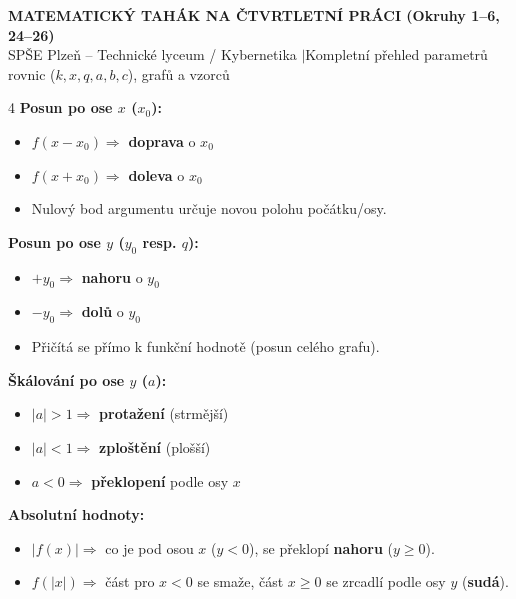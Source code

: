 \documentclass[9pt,a4paper]{article}
\begin{document}
\begin{tcolorbox}[colback=primary,colframe=primary,arc=1mm,left=2mm,right=2mm,top=1mm,bottom=1mm]
\color{white}
\begin{center}
{\bfseries\large MATEMATICKÝ TAHÁK NA ČTVRTLETNÍ PRÁCI (Okruhy 1--6, 24--26)}\\
{\footnotesize SPŠE Plzeň -- Technické lyceum / Kybernetika \quad$\vert$\quad Kompletní přehled parametrů rovnic ($k, x, q, a, b, c$), grafů a vzorců}
\end{center}
\end{tcolorbox}

\begin{tcolorbox}[secbox,title=0. UNIVERZÁLNÍ TRANSFORMACE GRAFŮ: $y = a \cdot f\bigl(b(x - x_0)\bigr) + y_0$ (nebo $a \cdot f(x - m) + n$)]
\begin{multicols}{4}
\textbf{Posun po ose $x$ ($x_0$):}
\begin{itemize}
  \item $f(x - x_0) \Rightarrow$ \textbf{doprava} o $x_0$
  \item $f(x + x_0) \Rightarrow$ \textbf{doleva} o $x_0$
  \item Nulový bod argumentu určuje novou polohu počátku/osy.
\end{itemize}
\columnbreak
\textbf{Posun po ose $y$ ($y_0$ resp. $q$):}
\begin{itemize}
  \item $+ y_0 \Rightarrow$ \textbf{nahoru} o $y_0$
  \item $- y_0 \Rightarrow$ \textbf{dolů} o $y_0$
  \item Přičítá se přímo k funkční hodnotě (posun celého grafu).
\end{itemize}
\columnbreak
\textbf{Škálování po ose $y$ ($a$):}
\begin{itemize}
  \item $|a| > 1 \Rightarrow$ \textbf{protažení} (strmější)
  \item $|a| < 1 \Rightarrow$ \textbf{zploštění} (plošší)
  \item $a < 0 \Rightarrow$ \textbf{překlopení} podle osy $x$
\end{itemize}
\columnbreak
\textbf{Absolutní hodnoty:}
\begin{itemize}
  \item $|f(x)| \Rightarrow$ co je pod osou $x$ ($y<0$), se překlopí \textbf{nahoru} ($y \ge 0$).
  \item $f(|x|) \Rightarrow$ část pro $x<0$ se smaže, část $x \ge 0$ se zrcadlí podle osy $y$ (\textbf{sudá}).
\end{itemize}
\end{multicols}
\end{tcolorbox}
\end{document}
